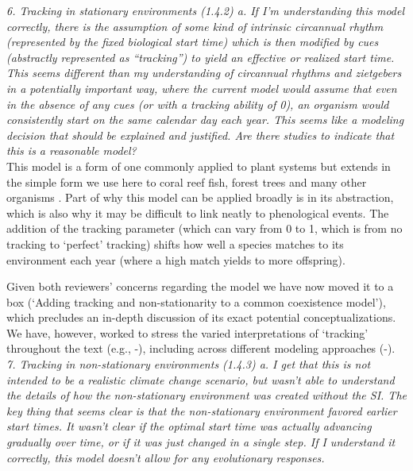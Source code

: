 \documentclass[11pt]{article}
\begin{document}
\emph{6.      Tracking in stationary environments (1.4.2)
a.      If I'm understanding this model correctly, there is the assumption of some kind of
intrinsic circannual rhythm (represented by the fixed biological start time) which is then
modified by cues (abstractly represented as ``tracking'') to yield an effective or realized start time. This seems different than my understanding of circannual rhythms and zietgebers %
in a potentially important way, where the current model would assume that even in the absence
of any cues (or with a tracking ability of 0), an organism would consistently start on the
same calendar day each year. This seems like a modeling decision that should be explained and
justified. Are there studies to indicate that this is a reasonable model?}\\

This model is a form of one commonly applied to plant systems but extends in the simple form we use here to coral reef fish, forest trees and many other organisms \citep[see][]{Chesson:1997dz}. Part of why this model can be applied broadly is in its abstraction, which is also why it may be difficult to link neatly to phenological events. The addition of the tracking parameter (which can vary from 0 to 1, which is from no tracking to `perfect' tracking) shifts how well a species matches to its environment each year (where a high match yields to more offspring). 

Given both reviewers' concerns regarding the model we have now moved it to a box (`Adding tracking and non-stationarity to a common coexistence model'), which precludes an in-depth discussion of its exact potential conceptualizations. We have, however, worked to stress the varied interpretations of `tracking' throughout the text (e.g., -), including across different modeling approaches (-).\\

\emph{7.      Tracking in non-stationary environments (1.4.3)
a.      I get that this is not intended to be a realistic climate change scenario, but wasn't
able to understand the details of how the non-stationary environment was created without the
SI. The key thing that seems clear is that the non-stationary environment favored earlier
start times. It wasn't clear if the optimal start time was actually advancing gradually over
time, or if it was just changed in a single step. If I understand it correctly, this model
doesn't allow for any evolutionary responses.}\\
\end{document}
